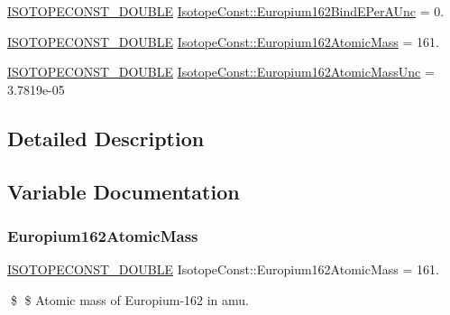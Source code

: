 \begin{DoxyCompactItemize}
\mbox{\hyperlink{group___isotope_const-_macros_ga8f45a7272ce02c0b4c65c44636ed719a}{I\+S\+O\+T\+O\+P\+E\+C\+O\+N\+S\+T\+\_\+\+D\+O\+U\+B\+LE}} \mbox{\hyperlink{group___isotope_const-_europium-_eu162_ga46f1c94a1a00e2b2f59842568d45473a}{Isotope\+Const\+::\+Europium162\+Bind\+E\+Per\+A\+Unc}} = 0.
\item 
\mbox{\hyperlink{group___isotope_const-_macros_ga8f45a7272ce02c0b4c65c44636ed719a}{I\+S\+O\+T\+O\+P\+E\+C\+O\+N\+S\+T\+\_\+\+D\+O\+U\+B\+LE}} \mbox{\hyperlink{group___isotope_const-_europium-_eu162_ga1bd17f5afd5fe05d2e5966d76efc3258}{Isotope\+Const\+::\+Europium162\+Atomic\+Mass}} = 161.
\item 
\mbox{\hyperlink{group___isotope_const-_macros_ga8f45a7272ce02c0b4c65c44636ed719a}{I\+S\+O\+T\+O\+P\+E\+C\+O\+N\+S\+T\+\_\+\+D\+O\+U\+B\+LE}} \mbox{\hyperlink{group___isotope_const-_europium-_eu162_ga4a0aa1932342d988eb21d724d9629ac2}{Isotope\+Const\+::\+Europium162\+Atomic\+Mass\+Unc}} = 3.\+7819e-\/05
\end{DoxyCompactItemize}


\subsection{Detailed Description}


\subsection{Variable Documentation}
\mbox{\label{group___isotope_const-_europium-_eu162_ga1bd17f5afd5fe05d2e5966d76efc3258}} 
\subsubsection{\texorpdfstring{Europium162\+Atomic\+Mass}{Europium162AtomicMass}}
{\footnotesize\ttfamily \mbox{\hyperlink{group___isotope_const-_macros_ga8f45a7272ce02c0b4c65c44636ed719a}{I\+S\+O\+T\+O\+P\+E\+C\+O\+N\+S\+T\+\_\+\+D\+O\+U\+B\+LE}} Isotope\+Const\+::\+Europium162\+Atomic\+Mass = 161.}

\$ \$ Atomic mass of Europium-\/162 in amu. \mbox{\label{group___isotope_const-_europium-_eu162_ga4a0aa1932342d988eb21d724d9629ac2}} 
